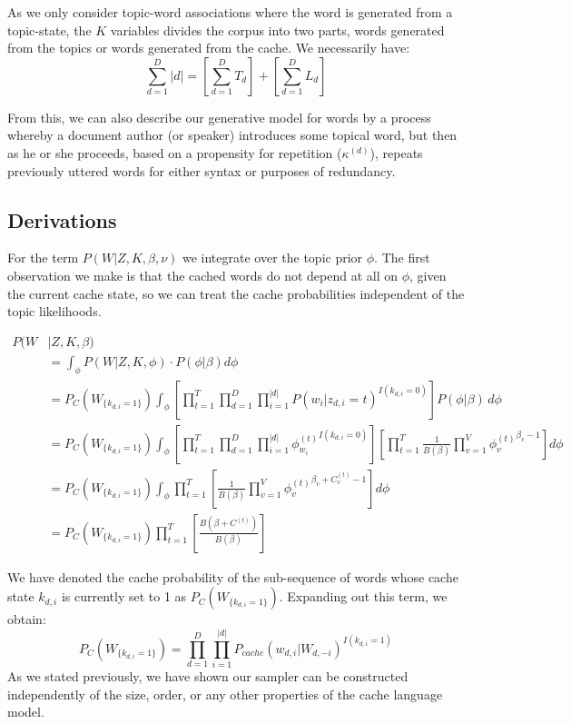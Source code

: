 As we only consider topic-word associations where the word is generated from a topic-state, the $K$ variables divides the corpus into two parts, words generated from the topics or words generated from the cache.  We necessarily have:
\begin{equation}
	\sum_{d=1}^D |d| = \left[\sum_{d=1}^D T_d\right] + \left[\sum_{d=1}^D L_d\right]
\end{equation}

From this, we can also describe our generative model for words by a process whereby a document author (or speaker) introduces some topical word, but then as he or she proceeds, based on a propensity for repetition ($\kappa^{(d)}$), repeats previously uttered words for either syntax or purposes of redundancy.  %
\subsection{Derivations}
For the term $P(W|Z,K,\beta,\nu)$ we  integrate over the topic prior $\phi$.  The first observation we make is that the cached words do not depend at all on $\phi$, given the current cache state, so we can treat the cache probabilities independent of the topic likelihoods.

{\small
\begin{align}
P(W&|Z,K,\beta) \\
 &= \int_{\phi} P(W|Z,K,\phi)\cdot P(\phi|\beta) d\phi\\
 &= P_C(W_{\{k_{d,i}=1\}}) \int_{\phi} \left [ \prod_{t=1}^T \prod_{d=1}^D \prod_{i=1}^{|d|} P(w_i|z_{d,i}=t)^{I(k_{d,i}=0)}  \right ] P(\phi|\beta)\, d\phi \\
&= P_C(W_{\{k_{d,i}=1\}}) \int_{\phi} \left [ \prod_{t=1}^T \prod_{d=1}^D \prod_{i=1}^{|d|} {\phi_{w_i}^{(t)}}^{I(k_{d,i}=0)}  \right ]  \left [ \prod_{t=1}^T \frac{1}{B(\beta)} \prod_{v=1}^V {\phi_v^{(t)}}^{\beta_v-1} \right ]  d\phi\\
&= P_C(W_{\{k_{d,i}=1\}}) \int_{\phi} \prod_{t=1}^T \left [ \frac{1}{B(\beta)} \prod_{v=1}^V {\phi_v^{(t)}}^{\beta_v + C^{(t)}_v - 1} \right ]  d\phi\\
&= P_C(W_{\{k_{d,i}=1\}}) \prod_{t=1}^T \left [ \frac{B(\beta + C^{(t)})}{B(\beta)} \right ] 
\end{align}
}

We have denoted the cache probability of the sub-sequence of words whose cache state $k_{d,i}$ is currently set to 1 as $P_C(W_{\{k_{d,i}=1\}})$.  Expanding out this term, we obtain:
\begin{equation}
P_C(W_{\{k_{d,i}=1\}})=\prod_{d=1}^D \prod_{i=1}^{|d|} P_{cache}(w_{d,i}|W_{d,-i})^{I(k_{d,i}=1)}
\end{equation}
\noindent As we stated previously, we have shown our sampler can be constructed independently of the size, order, or any other properties of the cache language model.


